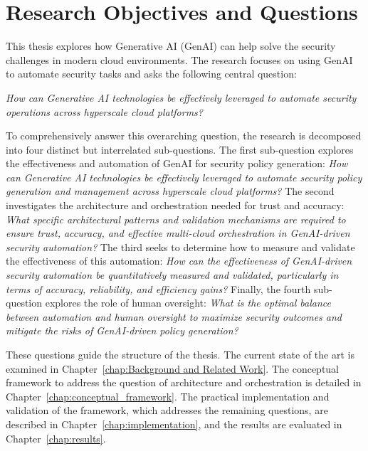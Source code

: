 \section{Research Objectives and Questions}
\label{sec:objectives_questions}

This thesis explores how Generative AI (GenAI) can help solve the security challenges in modern cloud environments. The research focuses on using GenAI to automate security tasks and asks the following central question:

\textit{How can Generative AI technologies be effectively leveraged to automate security operations across hyperscale cloud platforms?}

To comprehensively answer this overarching question, the research is decomposed into four distinct but interrelated sub-questions.
The first sub-question explores the effectiveness and automation of GenAI for security policy generation: \textit{How can Generative AI technologies be effectively leveraged to automate security policy generation and management across hyperscale cloud platforms?}
The second investigates the architecture and orchestration needed for trust and accuracy: \textit{What specific architectural patterns and validation mechanisms are required to ensure trust, accuracy, and effective multi-cloud orchestration in GenAI-driven security automation?}
The third seeks to determine how to measure and validate the effectiveness of this automation: \textit{How can the effectiveness of GenAI-driven security automation be quantitatively measured and validated, particularly in terms of accuracy, reliability, and efficiency gains?}
Finally, the fourth sub-question explores the role of human oversight: \textit{What is the optimal balance between automation and human oversight to maximize security outcomes and mitigate the risks of GenAI-driven policy generation?}

These questions guide the structure of the thesis. The current state of the art is examined in Chapter~\ref{chap:Background and Related Work}. The conceptual framework to address the question of architecture and orchestration is detailed in Chapter~\ref{chap:conceptual_framework}. The practical implementation and validation of the framework, which addresses the remaining questions, are described in Chapter~\ref{chap:implementation}, and the results are evaluated in Chapter~\ref{chap:results}.

